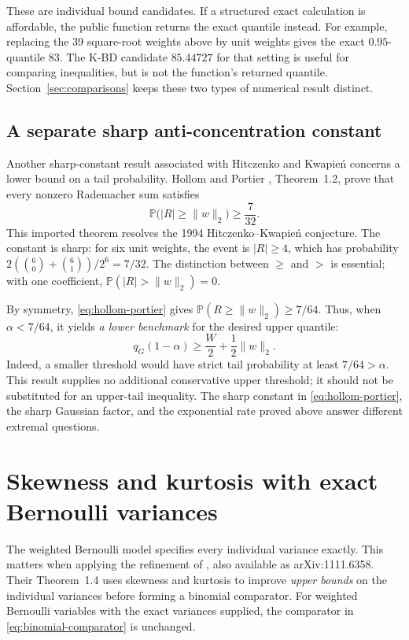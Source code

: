 \documentclass[11pt,letterpaper]{article}
\numberwithin{equation}{section}
\theoremstyle{definition}
\theoremstyle{remark}
\begin{document}
These are individual bound candidates. If a structured exact calculation
is affordable, the public function returns the exact quantile instead.
For example, replacing the 39 square-root weights above by unit weights
gives the exact $0.95$-quantile $83$. The K-BD candidate $85.44727$ for
that setting is useful for comparing inequalities, but is not the
function's returned quantile. Section~\ref{sec:comparisons} keeps these
two types of numerical result distinct.

\subsection{A separate sharp anti-concentration constant}

Another sharp-constant result associated with Hitczenko and Kwapie\'n
concerns a lower bound on a tail probability. Hollom and Portier
\cite{hollomportier2025}, Theorem~1.2, prove that every nonzero
Rademacher sum satisfies
\begin{equation}
 \mathbb P\bigl(|R|\ge\|w\|_2\bigr)\ge\frac7{32}.
 \label{eq:hollom-portier}
\end{equation}
This imported theorem resolves the 1994 Hitczenko--Kwapie\'n conjecture.
The constant is sharp: for six unit weights, the event is
$|R|\ge4$, which has probability $2(\binom{6}{0}+\binom{6}{1})/2^6=7/32$.
The distinction between $\ge$ and $>$ is essential; with one coefficient,
$\mathbb P(|R|>\|w\|_2)=0$.

By symmetry, \eqref{eq:hollom-portier} gives
$\mathbb P(R\ge\|w\|_2)\ge7/64$. Thus, when $\alpha<7/64$, it yields
\emph{a lower benchmark} for the desired upper quantile:
\[
 q_G(1-\alpha)\ge\frac W2+\frac12\|w\|_2.
\]
Indeed, a smaller threshold would have strict tail probability at least
$7/64>\alpha$. This result supplies no additional conservative upper
threshold; it should not be substituted for an upper-tail inequality.
The sharp constant in \eqref{eq:hollom-portier}, the sharp Gaussian factor,
and the exponential rate proved above answer different extremal questions.

\section{Skewness and kurtosis with exact Bernoulli variances}
\label{sec:skew-kurtosis}

The weighted Bernoulli model specifies every individual variance exactly.
This matters when applying the refinement of
\cite{bentkusjuskevicius2008}, also available as arXiv:1111.6358. Their
Theorem~1.4 uses skewness and kurtosis to improve \emph{upper bounds} on the
individual variances before forming a binomial comparator. For weighted
Bernoulli variables with the exact variances supplied, the comparator in
\eqref{eq:binomial-comparator} is unchanged.
\end{document}
